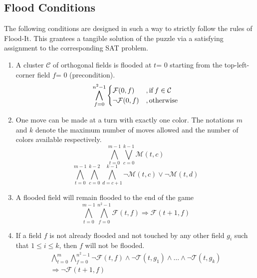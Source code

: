 \documentclass[conference]{IEEEtran}
\newcommand{\nMoves}{\ensuremath{m}\xspace}
\newcommand{\bSize}{\ensuremath{n}\xspace}
\newcommand{\clr}{\ensuremath{c}\xspace}
\newcommand{\nColors}{\ensuremath{k}\xspace}
\newcommand{\flood}[2]{\ensuremath{\mathcal{F}(#1,#2)}\xspace}
\newcommand{\move}[2]{\ensuremath{\mathcal{M}(#1,#2)}\xspace}
\newcommand{\touch}[2]{\ensuremath{\mathcal{T}(#1,#2)}\xspace}
\newcommand{\turn}{\ensuremath{t}\xspace}
\newcommand{\field}{\ensuremath{f}\xspace}
\newcommand{\cluster}{\ensuremath{\mathcal{C}}\xspace}
\begin{document}
\subsection{Flood Conditions}
The following conditions are designed in such a way to strictly follow the rules of Flood-It. This grantees a tangible solution of the puzzle via a satisfying assignment to the corresponding SAT problem.
\begin{enumerate}
	\item A cluster \cluster of orthogonal fields is flooded at \turn = 0 starting from the top-left-corner field \field = 0 (precondition).
	\begin{equation}
	\bigwedge_{\field=0}^{{\bSize^2}-1}
	\begin{cases}
	\flood{0}{\field}&, \text{if\:} \field\in\cluster\\
	\neg\flood{0}{\field}&, \text{otherwise}\\
	\end{cases}
	\end{equation}
	\item One move can be made at a turn with exactly one color. The notations \nMoves and \nColors denote the maximum number of moves allowed and the number of colors available respectively.
	\begin{equation}
	\bigwedge_{\turn=0}^{\nMoves-1}
	\bigvee_{\clr=0}^{\nColors-1}
	\move{\turn}{\clr}
	\end{equation}
	\begin{equation}
	\bigwedge_{\turn=0}^{\nMoves-1}
	\bigwedge_{\clr=0}^{\nColors-2}
	\bigwedge_{d=\clr+1}^{\nColors-1}
	\neg\move{\turn}{\clr}\vee
	\neg\move{\turn}{d}
	\end{equation}
	\item A flooded field will remain flooded to the end of the game
	\begin{equation}
	\bigwedge_{\turn=0}^{\nMoves-1}
	\bigwedge_{\field=0}^{{\bSize^2}-1}
	\flood{\turn}{\field}\Rightarrow\flood{\turn+1}{\field}
	\end{equation}
	\item If a field \field is not already flooded and not touched by any other field $g_i$ such that $1\leq i \leq k$, then \field will not be flooded. 
	\begin{multline}
	\bigwedge_{\turn=0}^{\nMoves}
	\bigwedge_{\field=0}^{{\bSize^2}-1}
	\neg\flood{\turn}{\field}\wedge\neg\touch{\turn}{g_1}\wedge\dots\wedge\neg\touch{\turn}{g_k}\\
	\Rightarrow\neg\flood{\turn+1}{\field}
	\end{multline}

\end{enumerate}
\end{document}
